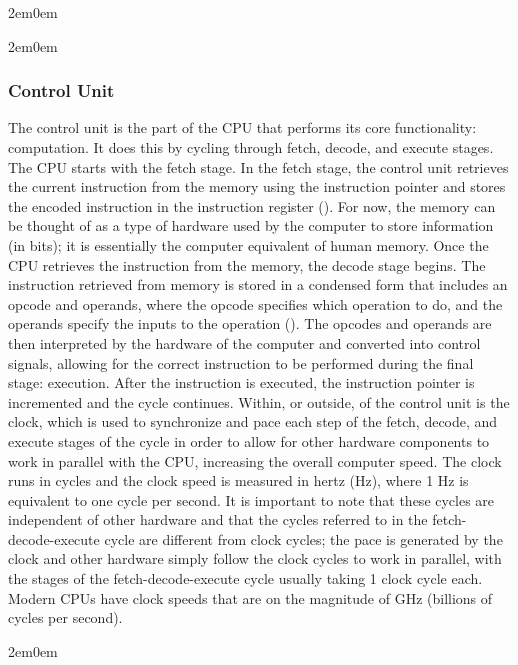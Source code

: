 \documentclass[openany, 12px]{book}
\begin{document}
\begin{adjustwidth}{2em}{0em}
\begin{adjustwidth}{2em}{0em}
\subsubsection{Control Unit}
The control unit is the part of the CPU that performs its core functionality: computation. It does this by cycling through fetch, decode, and execute stages. The CPU starts with the fetch stage. In the fetch stage, the control unit retrieves the current instruction from the memory using the instruction pointer and stores the encoded instruction in the instruction register (). For now, the memory can be thought of as a type of hardware used by the computer to store information (in bits); it is essentially the computer equivalent of human memory. Once the CPU retrieves the instruction from the memory, the decode stage begins. The instruction retrieved from memory is stored in a condensed form that includes an opcode and operands, where the opcode specifies which operation to do, and the operands specify the inputs to the operation (). The opcodes and operands are then interpreted by the hardware of the computer and converted into control signals, allowing for the correct instruction to be performed during the final stage: execution. After the instruction is executed, the instruction pointer is incremented and the cycle continues. Within, or outside, of the control unit is the clock, which is used to synchronize and pace each step of the fetch, decode, and execute stages of the cycle in order to allow for other hardware components to work in parallel with the CPU, increasing the overall computer speed. The clock runs in cycles and the clock speed is measured in hertz (Hz), where 1 Hz is equivalent to one cycle per second. It is important to note that these cycles are independent of other hardware and that the cycles referred to in the fetch-decode-execute cycle are different from clock cycles; the pace is generated by the clock and other hardware simply follow the clock cycles to work in parallel, with the stages of the fetch-decode-execute cycle usually taking 1 clock cycle each. Modern CPUs have clock speeds that are on the magnitude of GHz (billions of cycles per second).
\end{adjustwidth}

\begin{adjustwidth}{2em}{0em}

\end{adjustwidth}
\end{adjustwidth}
\end{document}

